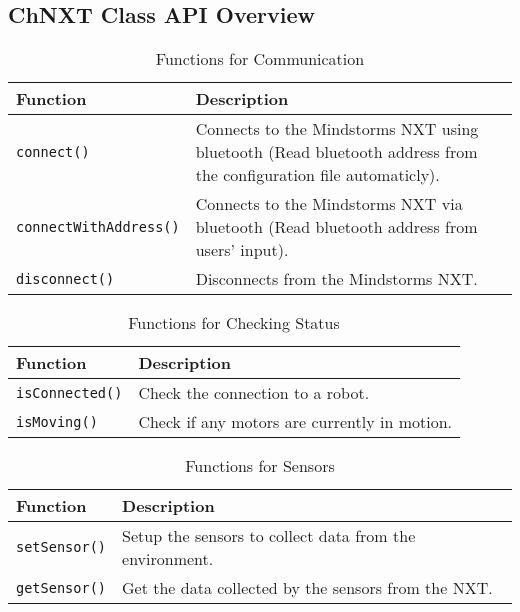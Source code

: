 \subsection{ChNXT Class API Overview}
\begin{longtable}{p{6cm}p{10cm}}
\caption{Functions for Communication}\\
\hline
Function & Description\\
\hline
{\tt connect()}&Connects to the Mindstorms NXT using bluetooth 
(Read bluetooth address from the configuration file automaticly).\\
{\tt connectWithAddress()}&Connects to the Mindstorms NXT via 
bluetooth (Read bluetooth address from users' input).\\
{\tt disconnect()}  &Disconnects from the Mindstorms NXT.\\
\hline
\end{longtable}
\begin{longtable}{ p{6cm}p{10cm}}
\caption{Functions for Checking Status}\\
\hline
Function & Description\\
\hline
{\tt isConnected()}    &Check the connection to a robot.\\
{\tt isMoving()}       &Check if any motors are currently in motion.\\
\hline
\end{longtable}
\begin{longtable}{p{6cm}p{10cm}}
\caption{Functions for Sensors}\\
\hline
Function & Description\\
\hline
{\tt setSensor()}       &Setup the sensors to collect data from the environment.\\
{\tt getSensor()}       &Get the data collected by the sensors from the NXT.\\
\hline
\end{longtable}

